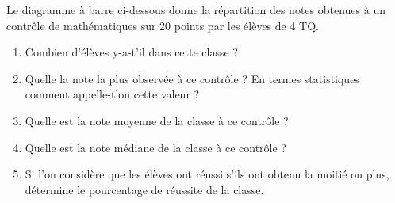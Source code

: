 %
%
    Le diagramme à barre ci-dessous donne la répartition des notes obtenues à un contrôle de mathématiques sur 20 points par les élèves de 4 TQ.
    \begin{center}
        
    \end{center}
    \begin{enumerate}
        \item Combien d'élèves y-a-t'il dans cette classe ?
        \item Quelle la note la plus observée à ce contrôle ? En termes statistiques comment appelle-t'on cette valeur ?
        \item Quelle est la note moyenne de la classe à ce contrôle ?
        \item Quelle est la note médiane de la classe à ce contrôle ?
        \item Si l'on considère que les élèves ont réussi s'ils ont obtenu la moitié ou plus, détermine le pourcentage de réussite de la classe.
    \end{enumerate}
